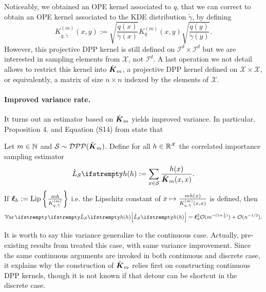 Noticeably, we obtained an OPE kernel associated to $q$, that we can correct to obtain an OPE kernel associated to the KDE distribution $\tilde \gamma$, by defining 
\begin{equation}
	K_{q, \tilde{\gamma}}^{(m)}(x, y):=\sqrt{\frac{q(x)}{\tilde{\gamma}(x)}} K_q^{(m)}(x, y) \sqrt{\frac{q(y)}{\tilde{\gamma}(y)}}.
\end{equation}
However, this projective DPP kernel is still defined on $\mathcal{I}^d \times \mathcal{I}^d$ but we are interested in sampling elements from $\mathcal{X}$, not $\mathcal{I}^d$. A last operation we not detail allows to restrict this kernel into $\tilde{\boldsymbol K}_{m}$, a projective DPP kernel defined on $\mathcal{X} \times \mathcal{X}$, or equivalently, a matrix of size $n \times n$ indexed by the elements of $\mathcal{X}$.

\paragraph{Improved variance rate.}
It turns out an estimator based on $\tilde{\boldsymbol K}_{m}$ yields improved variance. In particular, Proposition 4. and Equation (S14) from \cite{bardenet2021sgddpp} state that

\begin{tcolorbox}
	\begin{theorem}
		\label{thm_sgdpaper}
		Let $m\in \mathbb{N}$ and $\mathcal{S} \sim  \mathcal{DPP}(\tilde{\boldsymbol K}_{m})$. Define for all $h \in \mathbb{R}^{\mathcal{X}}$ the correlated importance sampling estimator
		\begin{equation}
			\estloss{\mathcal{S}}{\threequery} := \sum_{x \in \mathcal{S}} \frac{\threequery(x)}{\opekernel{m}(x,x)}.
		\end{equation}
		If  $\boldsymbol\ell_h := \operatorname{Lip}\left\{\frac{mh}{K^{(m)}_{q, \tilde \gamma}} \right\}$ i.e. the Lipschitz constant of $x \mapsto \frac{mh(x)}{K^{(m)}_{q, \tilde \gamma}(x,x)}$ is defined, then 
		\begin{equation}
			\label{eqn__improved_var}
			\Var{}{\estloss{\mathcal{S}}{\threequery}} = \lipschitz^2_\threequery \OO( m ^{-(1+\frac 1 d)}) +\OO( n^{-1/2}).
		\end{equation}
	\end{theorem}
\end{tcolorbox}

It is worth to say this variance generalize to the continuous case. Actually, pre-existing results from \cite{bardenet2020mcdpp} treated this case, with same variance improvement. Since the same continuous arguments are invoked in both continuous and discrete case, it explains why the construction of $\tilde{\boldsymbol K}_{m}$ relies first on constructing continuous DPP kernels, though it is not known if that detour can be shortcut in the discrete case.

